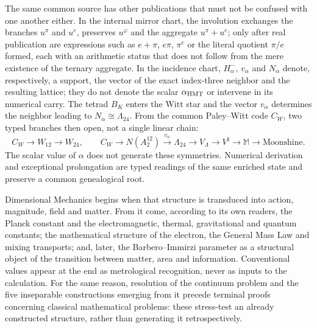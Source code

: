 The same common source has other publications that must not be confused
with one another either. In the internal mirror chart, the involution exchanges the branches
\(u^\pi\) and \(u^e\), preserves \(u^\varphi\) and the aggregate
\(u^\pi+u^e\); only after real publication are expressions such as
\(e+\pi\), \(e\pi\), \(\pi^e\) or the literal quotient \(\pi/e\) formed, each with
an arithmetic status that does not follow from the mere existence of the ternary
aggregate. In the incidence
chart, \(H^-_\alpha\), \(v_\alpha\) and \(N_\alpha\) denote,
respectively, a support, the vector of the exact index-three neighbor and the
resulting lattice; they do not denote the scalar \(\alpha_{\rm HMT}\) or intervene
in its numerical carry. The tetrad \(B_K\) enters the Witt star and the
vector \(v_\alpha\) determines the neighbor leading to
\(N_\alpha\cong\Lambda_{24}\). From the common Paley--Witt code \(C_W\),
two typed branches then open, not a single linear chain:
\[
 C_W\longrightarrow W_{12}\longrightarrow W_{24},
 \qquad
 C_W\longrightarrow N(A_2^{12})\xrightarrow{\,v_\alpha\,}\Lambda_{24}
 \longrightarrow V_\Lambda\longrightarrow V^\natural
 \longrightarrow\mathbb M\longrightarrow\text{Moonshine}.
\]
The scalar value of \(\alpha\) does not generate these symmetries. Numerical
derivation and exceptional prolongation are typed readings of the same enriched
state and preserve a common genealogical root.

Dimensional Mechanics begins when that structure is transduced into
action, magnitude, field and matter. From it come, according to its own
readers, the Planck constant and the electromagnetic,
thermal, gravitational and quantum constants; the mathematical structure of the electron,
the General Mass Law and mixing transports; and, later, the
Barbero--Immirzi parameter as a structural object of the transition between matter,
area and information. Conventional values appear at the end as
metrological recognition, never as inputs to the calculation. For the same
reason, resolution of the continuum problem and the five inseparable
constructions emerging from it precede terminal proofs concerning
classical mathematical problems: these stress-test an already
constructed structure, rather than generating it retrospectively.


